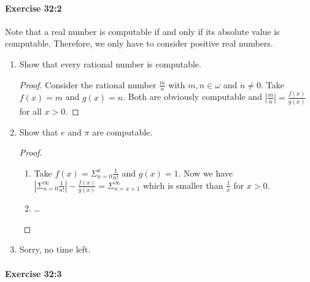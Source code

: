 \documentclass[a4paper,11pt]{article}
\begin{document}
\paragraph{Exercise 32:2}

Note that a real number is computable if and only if its absolute value is
computable. Therefore, we only have to consider positive real numbers.

\begin{enumerate}[label=(\alph*)]

\item
Show that every rational number is computable.

\begin{proof}
Consider the rational number $\frac{m}{n}$ with $m, n \in \omega$ and $n \neq 0$.
Take $f(x) = m$ and $g(x) = n$.
Both are obviously computable and $|\frac{m}{n}| = \frac{f(x)}{g(x)}$ for all $x > 0$.
\end{proof}

\item
Show that $e$ and $\pi$ are computable.

\begin{proof}
\begin{enumerate}[label=(\roman*)]
\item Take $f(x) = \Sigma_{n=0}^x \frac{1}{n!}$ and $g(x) = 1$.
Now we have $|\Sigma_{n=0}^\infty \frac{1}{n!}| - \frac{f(x)}{g(x)} = \Sigma_{n=x+1}^\infty$
which is smaller than $\frac{1}{x}$ for $x > 0$.
\item \ldots \qedhere
\end{enumerate}
\end{proof}

\item
Sorry, no time left.

\end{enumerate}


\paragraph{Exercise 32:3}
\end{document}
